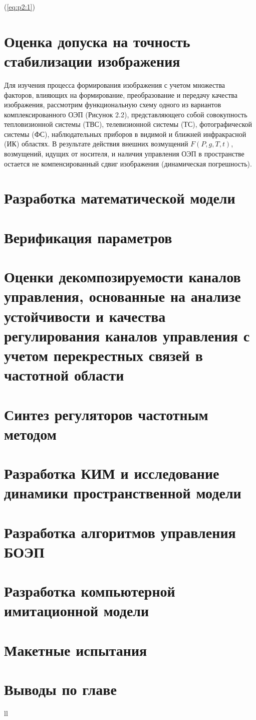 (\ref{eq:p2:1})


\section{Оценка допуска на точность стабилизации изображения} \label{sec:ch2/sec2}

Для изучения процесса формирования изображения с учетом множества факторов, влияющих на формирование, преобразование и передачу качества изображения, рассмотрим функциональную схему одного из вариантов комплексированного ОЭП (Рисунок 2.2), представляющего собой совокупность тепловизионной системы (ТВС), телевизионной системы (ТС), фотографической системы (ФС), наблюдательных приборов в видимой и ближней инфракрасной (ИК) областях. В результате действия внешних возмущений $F(P,g,T,t)$, возмущений, идущих от носителя, и наличия управления ОЭП в пространстве остается не компенсированный сдвиг изображения (динамическая погрешность).

\section{Разработка математической модели} \label{sec:ch2/sec3}

\section{Верификация параметров} \label{sec:ch2/sec4}

\section{Оценки декомпозируемости каналов управления, основанные на анализе устойчивости и качества регулирования каналов управления с учетом перекрестных связей в частотной области} \label{sec:ch2/sec5}

\section{Синтез регуляторов частотным методом} \label{sec:ch2/sec6}

\section{Разработка КИМ и исследование динамики пространственной модели} \label{sec:ch2/sec7}

\section{Разработка алгоритмов управления БОЭП} \label{sec:ch2/sec8}

\section{Разработка компьютерной имитационной модели} \label{sec:ch2/sec9}

\section{Макетные испытания} \label{sec:ch2/sec10}

\section{Выводы по главе} \label{sec:ch2/sec11}



ll

